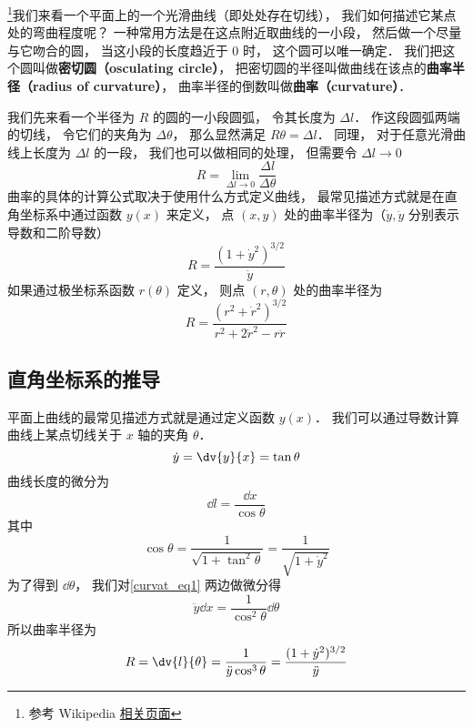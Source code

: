 

\footnote{参考 Wikipedia \href{https://en.wikipedia.org/wiki/Curvature}{相关页面}}我们来看一个平面上的一个光滑曲线（即处处存在切线）， 我们如何描述它某点处的弯曲程度呢？ 一种常用方法是在这点附近取曲线的一小段， 然后做一个尽量与它吻合的圆， 当这小段的长度趋近于 0 时， 这个圆可以唯一确定． 我们把这个圆叫做\textbf{密切圆（osculating circle）}， 把密切圆的半径叫做曲线在该点的\textbf{曲率半径（radius of curvature）}， 曲率半径的倒数叫做\textbf{曲率（curvature）}．

我们先来看一个半径为 $R$ 的圆的一小段圆弧， 令其长度为 $\Delta l$． 作这段圆弧两端的切线， 令它们的夹角为 $\Delta \theta$， 那么显然满足 $R \theta = \Delta l$． 同理， 对于任意光滑曲线上长度为 $\Delta l$ 的一段， 我们也可以做相同的处理， 但需要令 $\Delta l \to 0$
\begin{equation}\label{curvat_eq3}
R = \lim_{\Delta l \to 0} \frac{\Delta l}{\Delta \theta}
\end{equation}
曲率的具体的计算公式取决于使用什么方式定义曲线， 最常见描述方式就是在直角坐标系中通过函数 $y(x)$ 来定义， 点 $(x, y)$ 处的曲率半径为（$\dot y, \ddot y$ 分别表示导数和二阶导数）
\begin{equation}
R = \frac{(1 + \dot y^2)^{3/2}}{\ddot y}
\end{equation}
如果通过极坐标系函数 $r(\theta)$ 定义， 则点 $(r, \theta)$ 处的曲率半径为
\begin{equation}
R = \frac{(r^2 + \dot r^2)^{3/2}}{r^2 + 2\dot r^2 - r\ddot r}
\end{equation}

\subsection{直角坐标系的推导}

平面上曲线的最常见描述方式就是通过定义函数 $y(x)$． 我们可以通过导数计算曲线上某点切线关于 $x$ 轴的夹角 $\theta$．
\begin{equation}\label{curvat_eq1}
\dot y = \dv{y}{x} = \tan \theta
\end{equation}
曲线长度的微分为
\begin{equation}
\dd{l} = \frac{\dd{x}}{\cos\theta}
\end{equation}
其中
\begin{equation}\label{curvat_eq2}
\cos\theta = \frac{1}{\sqrt{1 + \tan^2\theta}} = \frac{1}{\sqrt{1 + \dot y^2}}
\end{equation}
为了得到 $\dd{\theta}$， 我们对\autoref{curvat_eq1} 两边做微分得
\begin{equation}
\ddot y \dd{x} = \frac{1}{\cos^2\theta} \dd{\theta}
\end{equation}
所以曲率半径为
\begin{equation}
R = \dv{l}{\theta} = \frac{1}{\ddot y\cos^3\theta} = \frac{(1 + \dot y^2)^{3/2}}{\ddot y}
\end{equation}

